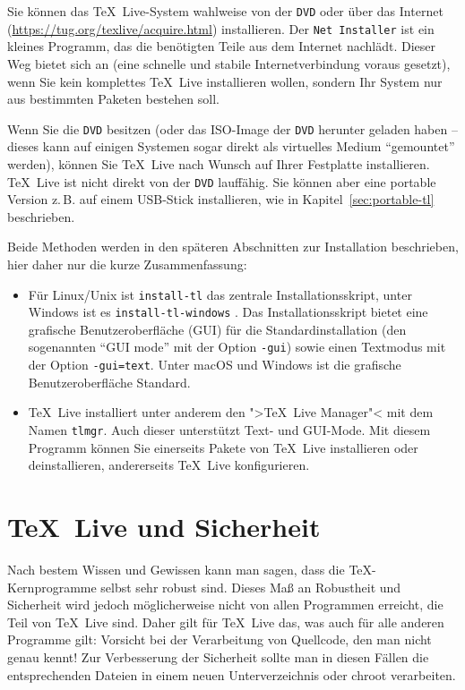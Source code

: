 \documentclass[12pt,ngerman,a4paper,fullparskip]{report}
\newcommand{\TL}{\TeX\ Live\xspace}
\newcommand{\acro}[1]{\texttt{#1}}
\newcommand{\cmdname}[1]{\texttt{#1}}
\newcommand{\code}[1]{\texttt{#1}}
\newcommand{\prog}[1]{\texttt{#1}}
\providecommand*{\DVD}{\acro{DVD}\xspace}
\providecommand*{\macOS}{macOS\xspace}
\begin{document}
Sie können das \TL-System wahlweise von der \DVD oder über das
Internet (\url{https://tug.org/texlive/acquire.html}) installieren.
Der \prog{Net Installer} ist ein kleines Programm,
das die benötigten Teile aus dem Internet nachlädt. Dieser Weg bietet
sich an (eine schnelle und stabile Internetverbindung voraus gesetzt),
wenn Sie kein komplettes \TL{} installieren wollen, sondern Ihr System nur
aus bestimmten Paketen bestehen soll.

Wenn Sie die \DVD{} besitzen (oder das ISO-Image der \DVD{} herunter
geladen haben -- dieses kann auf einigen Systemen sogar direkt als
virtuelles Medium \enquote{gemountet} werden), können Sie \TL{} nach
Wunsch auf Ihrer Festplatte installieren. \TL{} ist nicht direkt von der \DVD{} lauffähig. Sie können aber eine portable Version z.\,B. auf einem USB-Stick installieren, wie in Kapitel~\ref{sec:portable-tl} beschrieben.

Beide Methoden werden in den späteren Abschnitten zur Installation beschrieben, hier daher nur die kurze Zusammenfassung:

\begin{itemize}
\item Für Linux/Unix ist \cmdname{install-tl} das zentrale Installationsskript, unter Windows ist es \cmdname{install-tl-windows}  . Das Installationsskript bietet eine grafische Benutzeroberfläche (GUI) für die Standardinstallation  (den sogenannten \enquote{GUI mode} mit der Option \code{-gui}) sowie einen  Textmodus  mit der Option \code{-gui=text}. Unter \macOS und Windows ist die grafische Benutzeroberfläche Standard. 

\item \TL installiert unter anderem den ">\TL Manager"< mit dem Namen
\prog{tlmgr}. Auch dieser unterstützt Text- und GUI-Mode. Mit diesem
Programm können Sie einerseits Pakete von \TL installieren oder deinstallieren,
andererseits \TL konfigurieren.
\end{itemize}

\section{\TL und Sicherheit}

Nach bestem Wissen und Gewissen kann man sagen, dass die \TeX-Kernprogramme selbst sehr robust sind. Dieses Maß an Robustheit und Sicherheit wird jedoch möglicherweise nicht von allen Programmen erreicht, die Teil von \TL sind. Daher gilt für \TL das, was auch für alle anderen Programme gilt: Vorsicht bei der Verarbeitung von Quellcode, den man nicht genau kennt! Zur Verbesserung der Sicherheit sollte man in diesen Fällen die entsprechenden Dateien in einem neuen Unterverzeichnis oder chroot verarbeiten.
\end{document}
